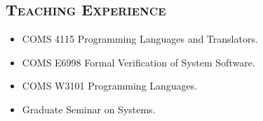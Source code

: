 \documentclass[10pt]{article}
\renewcommand{\section}[1]{
	\vspace{-5pt}
   	\subsection*{\scshape  \bfseries #1}
   }
\newenvironment{innerlist}[1][\enskip\textbullet]%
        {\begin{itemize}[#1,leftmargin=25pt,parsep=0pt,itemsep=2pt,topsep=2pt,partopsep=0pt]}
        {\end{itemize}}
\begin{document}
\section{Teaching Experience}
\begin{innerlist}
\item[] COMS 4115 Programming Languages and Translators.
\vspace{0.05in}

\item[] COMS E6998 
Formal Verification of System Software.
\vspace{0.05in}

\item[] COMS W3101 
Programming Languages.
\vspace{0.05in}

\item[] Graduate Seminar on Systems.
\end{innerlist}
\end{document}
